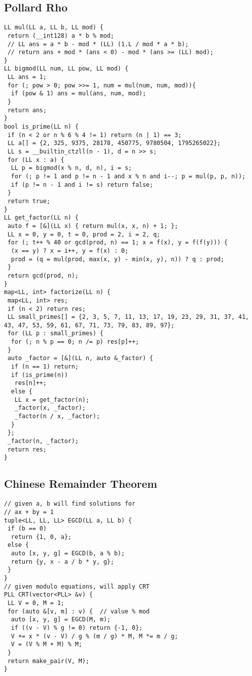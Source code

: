 \documentclass[a4paper,11pt,oneside]{article}
\begin{document}
\begin{multicols*}{\COLS}
\begin{lstlisting}
\end{lstlisting}
\subsection{Pollard Rho}
\begin{lstlisting}
LL mul(LL a, LL b, LL mod) {
 return (__int128) a * b % mod;
 // LL ans = a * b - mod * (LL) (1.L / mod * a * b);
 // return ans + mod * (ans < 0) - mod * (ans >= (LL) mod);
}
LL bigmod(LL num, LL pow, LL mod) {
 LL ans = 1;
 for (; pow > 0; pow >>= 1, num = mul(num, num, mod)){
  if (pow & 1) ans = mul(ans, num, mod);
 }
 return ans;
}
bool is_prime(LL n) {
 if (n < 2 or n % 6 % 4 != 1) return (n | 1) == 3;
 LL a[] = {2, 325, 9375, 28178, 450775, 9780504, 1795265022};
 LL s = __builtin_ctzll(n - 1), d = n >> s;
 for (LL x : a) {
  LL p = bigmod(x % n, d, n), i = s;
  for (; p != 1 and p != n - 1 and x % n and i--; p = mul(p, p, n));
  if (p != n - 1 and i != s) return false;
 }
 return true;
}
LL get_factor(LL n) {
 auto f = [&](LL x) { return mul(x, x, n) + 1; };
 LL x = 0, y = 0, t = 0, prod = 2, i = 2, q;
 for (; t++ % 40 or gcd(prod, n) == 1; x = f(x), y = f(f(y))) {
  (x == y) ? x = i++, y = f(x) : 0;
  prod = (q = mul(prod, max(x, y) - min(x, y), n)) ? q : prod;
 }
 return gcd(prod, n);
}
map<LL, int> factorize(LL n) {
 map<LL, int> res;
 if (n < 2) return res;
 LL small_primes[] = {2, 3, 5, 7, 11, 13, 17, 19, 23, 29, 31, 37, 41, 43, 47, 53, 59, 61, 67, 71, 73, 79, 83, 89, 97};
 for (LL p : small_primes) {
  for (; n % p == 0; n /= p) res[p]++;
 }
 auto _factor = [&](LL n, auto &_factor) {
  if (n == 1) return;
  if (is_prime(n))
   res[n]++;
  else {
   LL x = get_factor(n);
   _factor(x, _factor);
   _factor(n / x, _factor);
  }
 };
 _factor(n, _factor);
 return res;
}
\end{lstlisting}
\subsection{Chinese Remainder Theorem}
\begin{lstlisting}
// given a, b will find solutions for
// ax + by = 1
tuple<LL, LL, LL> EGCD(LL a, LL b) {
 if (b == 0)
  return {1, 0, a};
 else {
  auto [x, y, g] = EGCD(b, a % b);
  return {y, x - a / b * y, g};
 }
}
// given modulo equations, will apply CRT
PLL CRT(vector<PLL> &v) {
 LL V = 0, M = 1;
 for (auto &[v, m] : v) {  // value % mod
  auto [x, y, g] = EGCD(M, m);
  if ((v - V) % g != 0) return {-1, 0};
  V += x * (v - V) / g % (m / g) * M, M *= m / g;
  V = (V % M + M) % M;
 }
 return make_pair(V, M);
}
\end{lstlisting}

\end{multicols*}
\end{document}
